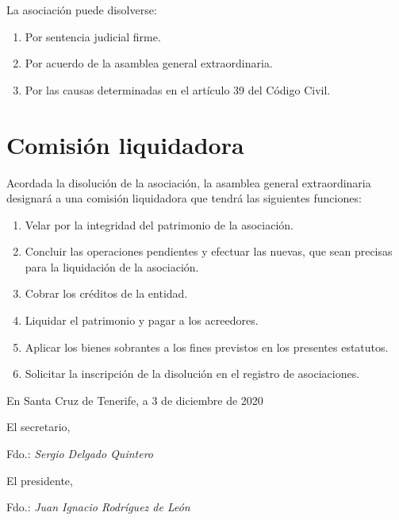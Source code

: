 \documentclass[a4paper, 12pt, oneside]{book}
\begin{document}
La asociación puede disolverse:

\begin{enumerate}
    \item Por sentencia judicial firme.  
    \item Por acuerdo de la asamblea general extraordinaria.  
    \item Por las causas determinadas en el artículo 39 del Código Civil.
\end{enumerate}

\section{Comisión liquidadora}

Acordada la disolución de la asociación, la asamblea general extraordinaria designará a una comisión liquidadora que tendrá las siguientes funciones:

\begin{enumerate}
    \item Velar por la integridad del patrimonio de la asociación.  
    \item Concluir las operaciones pendientes y efectuar las nuevas, que sean precisas para la liquidación de la asociación.  
    \item Cobrar los créditos de la entidad.  
    \item Liquidar el patrimonio y pagar a los acreedores.  
    \item Aplicar los bienes sobrantes a los fines previstos en los presentes estatutos.  
    \item Solicitar la inscripción de la disolución en el registro de asociaciones.
\end{enumerate}

\begin{flushright}
    En Santa Cruz de Tenerife, a 3 de diciembre de 2020
\end{flushright}

\vspace{15mm}

\begin{multicols}{2}
    \noindent
    El secretario,

    \vspace{25mm}

    \noindent
    Fdo.: \textit{Sergio Delgado Quintero}

    \vfill\null
    \columnbreak
    \begin{flushright}
        El presidente,
    
        \vspace{25mm}
    
        \noindent
        Fdo.: \textit{Juan Ignacio Rodríguez de León}
    \end{flushright}
\end{multicols}
\end{document}
